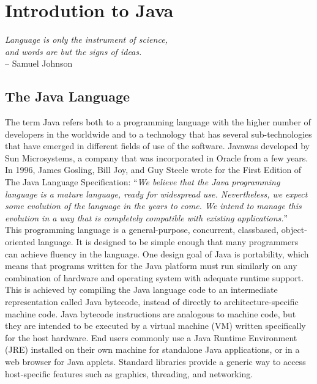 \chapter{Introdution to Java}
\label{ch:java}


\begin{flushright}
	{\smaller
		\textit{Language is only the instrument of science, \\and words are but the signs of ideas.}\\
		-- Samuel Johnson}
\end{flushright}


\section{The Java Language}
The term Java refers both to a programming language with the higher number of developers in the worldwide and to a technology that has several sub-technologies that have emerged in different fields of use of the software. Javawas developed by Sun Microsystems, a company that was incorporated in Oracle from a few years.
In 1996, James Gosling, Bill Joy, and Guy Steele wrote for the First Edition of The Java Language Specification:
``{\itshape We believe that the Java programming language is a mature language, ready for widespread use. Nevertheless, we expect some evolution of the language in the years to come. We intend to manage this evolution in a way that is completely compatible with existing applications.}''\\
This programming language is a general-purpose, concurrent, classbased, object-oriented language. It is designed to be simple enough that many programmers can achieve fluency in the language.\cite{javaoracle}
One design goal of Java is portability, which means that programs written for the Java platform must run similarly on any combination of hardware and operating system with adequate runtime support. This is achieved by compiling the Java language code to an intermediate representation called Java bytecode, instead of directly to architecture-specific machine code. Java bytecode instructions are analogous to machine code, but they are intended to be executed by a virtual machine (VM) written specifically for the host hardware. End users commonly use a Java Runtime Environment (JRE) installed on their own machine for standalone Java applications, or in a web browser for Java applets.\cite{wiki:java}
Standard libraries provide a generic way to access host-specific features such as graphics, threading, and networking.\\
